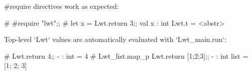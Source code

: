 #require directives work as expected:

\begin{ocaml}
# #require "lwt";;
# let x = Lwt.return 3;;
val x : int Lwt.t = <abstr>
\end{ocaml}

Top-level `Lwt` values are automatically evaluated with `Lwt_main.run`:

\begin{ocaml}
# Lwt.return 4;;
- : int = 4
# Lwt_list.map_p Lwt.return [1;2;3];;
- : int list = [1; 2; 3]
\end{ocaml}
